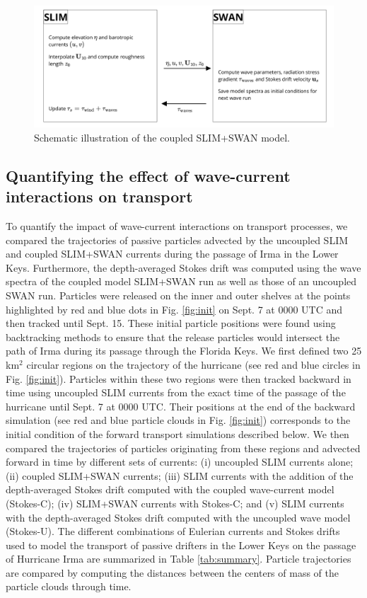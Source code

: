 \documentclass[preprint,12pt,authoryear]{elsarticle}
\begin{document}
\begin{figure}
    \centering
    \includegraphics[width=.99\textwidth]{coupling_v2.png}
    \caption{Schematic illustration of the coupled SLIM+SWAN model.}
    \label{fig:coupling}
\end{figure}

\subsection{Quantifying the effect of wave-current interactions on transport}\label{sec:traj}

To quantify the impact of wave-current interactions on transport processes, we compared the trajectories of passive particles advected by the uncoupled SLIM and coupled SLIM+SWAN currents during the passage of Irma in the Lower Keys. Furthermore, the depth-averaged Stokes drift was computed using the wave spectra of the coupled model SLIM+SWAN run as well as those of an uncoupled SWAN run. Particles were released on the inner and outer shelves at the points highlighted by red and blue dots in Fig. \ref{fig:init} on Sept. 7 at 0000 UTC and then tracked until Sept. 15. These initial particle positions were found using backtracking methods \citep{spivakovskaya2005simulation} to ensure that the release particles would intersect the path of Irma during its passage through the Florida Keys. We first defined two 25 km$^\text{2}$ circular regions on the trajectory of the hurricane (see red and blue circles in Fig. \ref{fig:init}). Particles within these two regions were then tracked backward in time using uncoupled SLIM currents from the exact time of the passage of the hurricane until Sept. 7 at 0000 UTC. Their positions at the end of the backward simulation (see red and blue particle clouds in Fig. \ref{fig:init}) corresponds to the initial condition of the forward transport simulations described below. We then compared the trajectories of particles originating from these regions and advected forward in time by different sets of currents: (i) uncoupled SLIM currents alone; (ii) coupled SLIM+SWAN currents; (iii) SLIM currents with the addition of the depth-averaged Stokes drift computed with the coupled wave-current model (Stokes-C); (iv) SLIM+SWAN currents with Stokes-C; and (v) SLIM currents with the depth-averaged Stokes drift computed with the uncoupled wave model (Stokes-U). The different combinations of Eulerian currents and Stokes drifts used to model the transport of passive drifters in the Lower Keys on the passage of Hurricane Irma are summarized in Table \ref{tab:summary}. Particle trajectories are compared by computing the distances between the centers of mass of the particle clouds through time.
\end{document}
